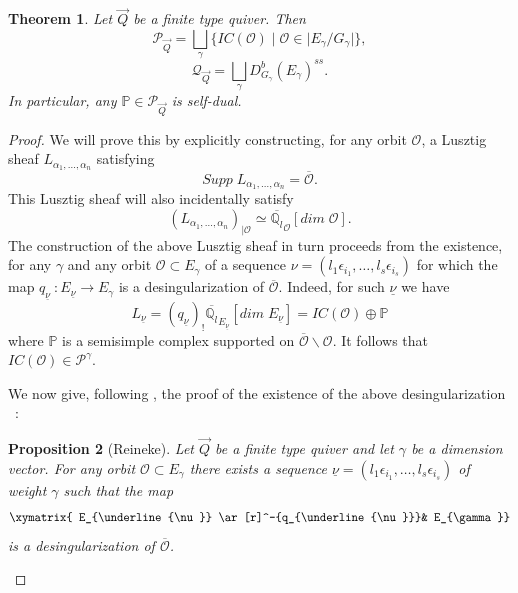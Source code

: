 \documentclass[a4paper,10pt]{amsart}
\def\a{\alpha}
\def\qlb{\overline{\mathbb{Q}_l}}
\def\QQ{\mathcal{Q}_{\vec{Q}}}
\newtheorem{theo}{\bf{Theorem}}[section]
\newtheorem{prop}[theo]{Proposition}
\numberwithin{equation}{section}
\begin{document}
\vspace{.1in}

\begin{theo}\label{T:finiteype} Let $\vec{Q}$ be a finite type quiver. Then 
$$\mathcal{P}_{\vec{Q}} =\bigsqcup_{\gamma} \big\{ IC(\mathcal{O})\;|\; \mathcal{O} \in | E_{\gamma}/G_{\gamma}|\big\},$$
$$\QQ = \bigsqcup_{\gamma} D^b_{G_{\gamma}}(E_{\gamma})^{ss}.$$
In particular, any $\mathbb{P} \in \mathcal{P}_{\vec{Q}}$ is self-dual.
\end{theo}
\begin{proof} We will prove this by explicitly constructing, for any orbit $\mathcal{O}$, a Lusztig sheaf $L_{\a_1, \ldots, \a_n}$ satisfying
\begin{equation}\label{E:26}
Supp\; L_{\a_1, \ldots, \a_n}=\overline{\mathcal{O}}.
\end{equation}
This Lusztig sheaf will also incidentally satisfy
\begin{equation}\label{E:27}
(L_{\a_1, \ldots, \a_n})_{|\mathcal{O}} \simeq \qlb_{\mathcal{O}}[dim \;\mathcal{O}].
\end{equation}
The construction of the above Lusztig sheaf in turn proceeds from the existence, for any $\gamma$ and any orbit $\mathcal{O} \subset E_{\gamma}$ of a sequence 
$\nu=(l_1\epsilon_{i_1}, \ldots, l_s \epsilon_{i_s})$ for which the map $q_{\underline{\nu}}~:E_{\underline{\nu}} \to E_{\gamma}$ is a desingularization of $\overline{\mathcal{O}}$. Indeed, for such $\underline{\nu}$ we have
$$L_{\underline{\nu}} =(q_{\underline{\nu}})_! \qlb_{E_{\underline{\nu}}}[dim\;E_{\underline{\nu}}] = IC(\mathcal{O}) \oplus \mathbb{P}$$ where $\mathbb{P}$ is a semisimple complex supported on $ \overline{\mathcal{O}}\backslash \mathcal{O}$. It follows that $IC(\mathcal{O}) \in \mathcal{P}^{\gamma}$.

\vspace{.1in}

We now give, following \cite{Reinekedesing}, the proof of the existence of the above desingularization ~: 

\begin{prop}[Reineke]\label{P:Reineke} Let $\vec{Q}$ be a finite type quiver and let $\gamma$ be a dimension vector. For any orbit $\mathcal{O} \subset E_{\gamma}$ there exists a sequence $\underline{\nu} =(l_1\epsilon_{i_1}, \ldots, l_s \epsilon_{i_s})$ of weight $\gamma$ such that the map
$$\xymatrix{ E_{\underline{\nu}} \ar[r]^-{q_{\underline{\nu}}}& E_{\gamma}}$$
is a desingularization of $\overline{\mathcal{O}}$.
\end{prop}


\end{proof}
\end{document}
